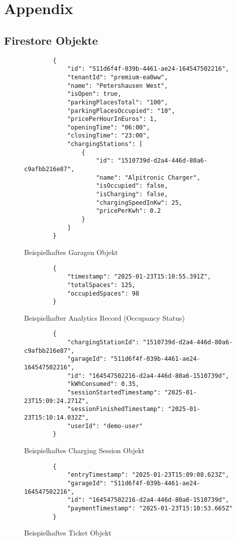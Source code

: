 \section{Appendix}

\subsection{Firestore Objekte}

\begin{figure}[H]
	\begin{verbatim}
		{
			"id": "511d6f4f-039b-4461-ae24-164547502216",
			"tenantId": "premium-ea0ww",
			"name": "Petershausen West",
			"isOpen": true,
			"parkingPlacesTotal": "100",
			"parkingPlacesOccupied": "10",
			"pricePerHourInEuros": 1,
			"openingTime": "06:00",
			"closingTime": "23:00",
			"chargingStations": [
				{
					"id": "1510739d-d2a4-446d-80a6-c9afbb216e87",
					"name": "Alpitronic Charger",
					"isOccupied": false,
					"isCharging": false,
					"chargingSpeedInKw": 25,
					"pricePerKwh": 0.2
				}
			]
		}
	\end{verbatim}
	\caption{Beispielhaftes Garagen Objekt}
	\label{fig:garage-object}
\end{figure}

\begin{figure}[H]
	\begin{verbatim}
		{
			"timestamp": "2025-01-23T15:10:55.391Z",
			"totalSpaces": 125,
			"occupiedSpaces": 98
		}
	\end{verbatim}
	\caption{Beispielhafter Analytics Record (Occupancy Status)}
	\label{fig:analytics-record}
\end{figure}

\begin{figure}[H]
	\begin{verbatim}
		{
			"chargingStationId": "1510739d-d2a4-446d-80a6-c9afbb216e87",
			"garageId": "511d6f4f-039b-4461-ae24-164547502216",
			"id": "164547502216-d2a4-446d-80a6-1510739d",
			"kWhConsumed": 0.35,
			"sessionStartedTimestamp": "2025-01-23T15:09:24.271Z",
			"sessionFinishedTimestamp": "2025-01-23T15:10:14.032Z",
			"userId": "demo-user"
		}
	\end{verbatim}
	\caption{Beispielhaftes Charging Session Objekt}
	\label{fig:charging-session-object}
\end{figure}

\begin{figure}[H]
	\begin{verbatim}
		{
			"entryTimestamp": "2025-01-23T15:09:08.623Z",
			"garageId": "511d6f4f-039b-4461-ae24-164547502216",
			"id": "164547502216-d2a4-446d-80a6-1510739d",
			"paymentTimestamp": "2025-01-23T15:10:53.665Z"
		}
	\end{verbatim}
	\caption{Beispielhaftes Ticket Objekt}
	\label{fig:ticket-object}
\end{figure}

